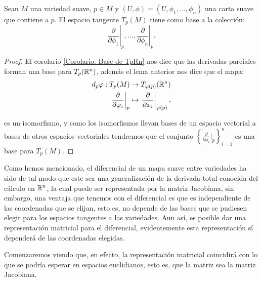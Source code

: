 \begin{theorem}\label{Teorema: Base para el espacio tangente}
	Sean $M$ una variedad suave, $p \in M$ y $(U,\phi) = (U, \phi_1, \dots, \phi_n)$ una carta suave que contiene a $p$. El espacio tangente $T_p(M)$ tiene como base a la colección:
	\[
		\left. \frac{\partial}{\partial \phi_1} \right|_p, \hdots, \left. \frac{\partial}{\partial \phi_n} \right|_p .
	\]
\end{theorem}

\begin{proof}
	El corolario \ref{Corolario: Base de TpRn} nos dice que las derivadas parciales forman una base para $T_p(\mathbb{R}^n)$, además el lema anterior nos dice que el mapa:
	\begin{align*}
		d_p\varphi: T_p(M)                                     & \to T_{\varphi(p)} (\mathbb{R}^n) \\
		\left. \frac{\partial}{\partial \varphi_i} \right|_{p} & \mapsto
		\left. \frac{\partial}{\partial x_i} \right|_{\varphi(p)},
	\end{align*}

	es un isomorfismo, y como los isomorfismos llevan bases de un espacio vectorial a bases de otros espacios vectoriales tendremos que el conjunto $\left\{ \frac{\partial}{\partial \phi_{i}}|_{p} \right\}_{i=1}^{n}$ es una base para $T_{p}(M)$.
\end{proof}

Como hemos mencionado, el diferencial de un mapa suave entre variedades ha sido de tal modo que este sea una generalización de la derivada total conocida del cálculo en $\mathbb{R}^n$, la cual puede ser representada por la matriz Jacobiana, sin embargo, una ventaja que tenemos con el diferencial es que es independiente de las coordenadas que se elijan, esto es, no depende de las bases que se pudiesen elegir para los espacios tangentes a las variedades. Aun así, es posible dar una representación matricial para el diferencial, evidentemente esta representación sí dependerá de las coordenadas elegidas.

Comenzaremos viendo que, en efecto, la representación matricial coincidirá con lo que se podría esperar en espacios euclidianos, esto es, que la matriz sea la matriz Jacobiana.

